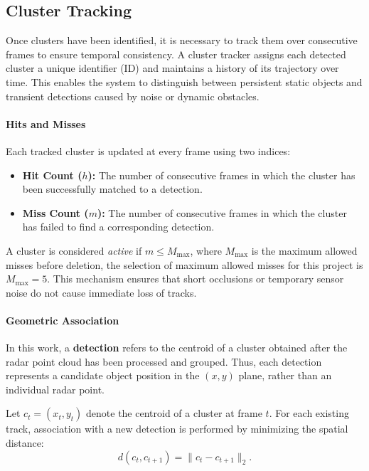 \vspace{1\baselineskip}
\subsection{Cluster Tracking}
\label{subsec:cluster_tracking}

Once clusters have been identified, it is necessary to track them over consecutive frames to ensure temporal consistency. 
A cluster tracker assigns each detected cluster a unique identifier (ID) and maintains a history of its trajectory over time. 
This enables the system to distinguish between persistent static objects and transient detections caused by noise or dynamic obstacles.

\paragraph{Hits and Misses}
Each tracked cluster is updated at every frame using two indices: 
\begin{itemize}
    \item \textbf{Hit Count ($h$):} The number of consecutive frames in which the cluster has been successfully matched to a detection.
    \item \textbf{Miss Count ($m$):} The number of consecutive frames in which the cluster has failed to find a corresponding detection.
\end{itemize}

A cluster is considered \textit{active} if $m \leq M_{\text{max}}$, where $M_{\text{max}}$ is the maximum allowed misses before deletion, the selection of maximum allowed misses for this project is $M_{\text{max}} = 5$. 
This mechanism ensures that short occlusions or temporary sensor noise do not cause immediate loss of tracks.

\paragraph{Geometric Association}
In this work, a \textbf{detection} refers to the centroid of a cluster obtained after the radar point cloud has been processed and grouped.  
Thus, each detection represents a candidate object position in the $(x,y)$ plane, rather than an individual radar point.  

Let $c_t = (x_t, y_t)$ denote the centroid of a cluster at frame $t$.  
For each existing track, association with a new detection is performed by minimizing the spatial distance:
\begin{equation}
    d(c_t, c_{t+1}) = \lVert c_t - c_{t+1} \rVert_2.
\end{equation}

